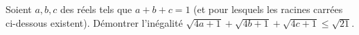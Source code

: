 Soient $a, b, c$ des réels tels que $a + b + c = 1$ (et pour lesquels les racines carrées ci-dessous existent). Démontrer l'inégalité $\sqrt{4a + 1} + \sqrt{4b + 1} + \sqrt{4c + 1} \leq \sqrt{21}$.

